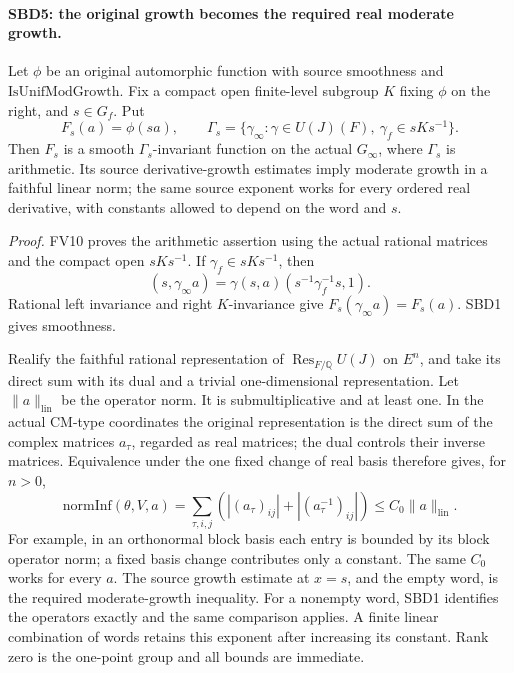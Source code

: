 \paragraph{SBD5: the original growth becomes the required real moderate growth.}
\label{claim:SBD5}
Let \(\phi\) be an original automorphic function with source
smoothness and \(\mathrm{IsUnifModGrowth}\).  Fix a compact open
finite-level subgroup \(K\) fixing \(\phi\) on the right, and
\(s\in G_f\).  Put
\[
 F_s(a)=\phi(sa),\qquad
 \Gamma_s=\{\gamma_\infty:\gamma\in U(J)(F),\
                         \gamma_f\in sKs^{-1}\}.
 \tag{SBD.9}
\]
Then \(F_s\) is a smooth \(\Gamma_s\)-invariant function on the
actual \(G_\infty\), where \(\Gamma_s\) is arithmetic.  Its
source derivative-growth estimates imply moderate growth in a
faithful linear norm; the same source exponent works for every
ordered real derivative, with constants allowed to depend on
the word and \(s\).

\emph{Proof.}
FV10 proves the arithmetic assertion using the actual rational
matrices and the compact open \(sKs^{-1}\).  If
\(\gamma_f\in sKs^{-1}\), then
\[
 (s,\gamma_\infty a)=\gamma(s,a)
                  (s^{-1}\gamma_f^{-1}s,1).
\]
Rational left invariance and right \(K\)-invariance give
\(F_s(\gamma_\infty a)=F_s(a)\).  SBD1 gives smoothness.

Realify the faithful rational representation of
\(\operatorname{Res}_{F/\mathbb Q}U(J)\) on \(E^n\), and take
its direct sum with its dual and a trivial one-dimensional
representation.  Let \(\|a\|_{\mathrm{lin}}\) be the operator
norm.  It is submultiplicative and at least one.  In the actual
CM-type coordinates the original representation is the direct
sum of the complex matrices \(a_\tau\), regarded as real matrices;
the dual controls their inverse matrices.  Equivalence under the
one fixed change of real basis therefore gives, for \(n>0\),
\[
 \mathrm{normInf}(\theta,V,a)
   =\sum_{\tau,i,j}(|(a_\tau)_{ij}|+|(a_\tau^{-1})_{ij}|)
   \le C_0\|a\|_{\mathrm{lin}}.
 \tag{SBD.10}
\]
For example, in an orthonormal block basis each entry is bounded
by its block operator norm; a fixed basis change contributes only
a constant.  The same \(C_0\) works for every \(a\).
The source growth estimate at \(x=s\), and the empty word, is
the required moderate-growth inequality.  For a nonempty word,
SBD1 identifies the operators exactly and the same comparison
applies.  A finite linear combination of words retains this
exponent after increasing its constant.  Rank zero is the
one-point group and all bounds are immediate.

